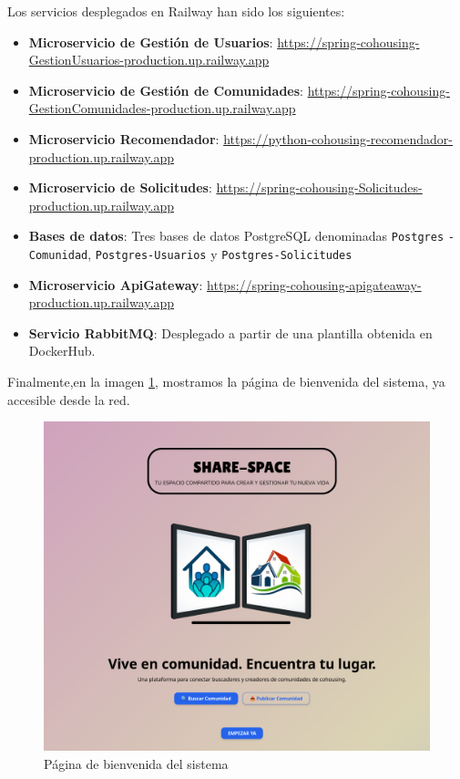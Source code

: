 \vspace{0.5em}
Los servicios desplegados en Railway han sido los siguientes:
\vspace{0.5em}
\begin{itemize}
    \item \textbf{Microservicio de Gestión de Usuarios}: \url{https://spring-cohousing-GestionUsuarios-production.up.railway.app} \vspace{0.5em}
    \item \textbf{Microservicio de Gestión de Comunidades}: \url{https://spring-cohousing-GestionComunidades-production.up.railway.app} \vspace{0.25em}
    \item \textbf{Microservicio Recomendador}: \url{https://python-cohousing-recomendador-production.up.railway.app} \vspace{0.25em}
    \item \textbf{Microservicio de Solicitudes}: \url{https://spring-cohousing-Solicitudes-production.up.railway.app} \vspace{0.25em}
    \item \textbf{Bases de datos}: Tres bases de datos PostgreSQL denominadas \texttt{Postgres} 
    \texttt{-Comunidad}, \texttt{Postgres-Usuarios} y \texttt{Postgres-Solicitudes} \vspace{0.25em}
    \item \textbf{Microservicio ApiGateway}: \url{https://spring-cohousing-apigateaway-production.up.railway.app} \vspace{0.25em}
    \item \textbf{Servicio RabbitMQ}: Desplegado a partir de una plantilla obtenida en DockerHub.
\end{itemize}

Finalmente,en la imagen \ref{fig:onboard}, mostramos la página de bienvenida del sistema, ya accesible desde la red.
\begin{figure}[H]
  \centering
  \includegraphics[width=1\textwidth]{fotos/onboard.png}
  \caption{Página de bienvenida del sistema}
  \label{fig:onboard}
\end{figure}

\vspace{0.5em}


